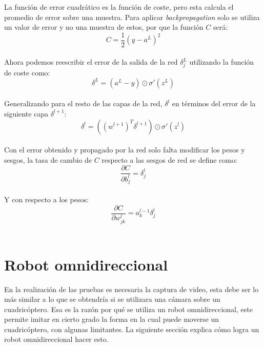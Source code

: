 \documentclass{iccmemoria}
\begin{document}
La función de error cuadrático es la función de coste, pero esta calcula el promedio de error sobre una muestra. Para aplicar \emph{backpropagation} solo se utiliza un valor de error y no una muestra de estos, por que la función $C$ será:\\

\begin{equation}
	C = \frac{1}{2} (y-a^L )^2
\end{equation}\\

Ahora podemos reescribir el error de la salida de la red $\delta^L_j$ utilizando la función de coste como:\\

\begin{equation}
	\delta^L = (a^L-y) \odot \sigma'(z^L)
\end{equation}\\

Generalizando para el resto de las capas de la red, $\delta^l$ en términos del error de la siguiente capa $\delta^{l+1}$:\\

\begin{equation}
	\delta^l = ((w^{l+1})^T \delta^{l+1}) \odot \sigma'(z^l)
\end{equation}\\

Con el error obtenido y propagado por la red solo falta modificar los pesos y sesgos, la tasa de cambio de $C$ respecto a las sesgos de red se define como:\\

\begin{equation}
	\frac{\partial C}{\partial b^l_j} =
  \delta^l_j
\end{equation}\\

Y con respecto a los pesos:\\

\begin{equation}
	\frac{\partial C}{\partial w^l_{jk}} = a^{l-1}_k \delta^l_j
\end{equation}\\

\section{Robot omnidireccional}\label{omni_robot}

En la realización de las pruebas es necesaria la captura de video, esta debe ser lo más similar a lo que se obtendría si se utilizara una cámara sobre un cuadricóptero. Esa es la razón por qué se utiliza un robot omnidireccional, este permite imitar en cierto grado la forma en la cual puede moverse un cuadricóptero, con algunas limitantes. La siguiente sección explica cómo logra un robot omnidireccional hacer esto.\\
\end{document}
